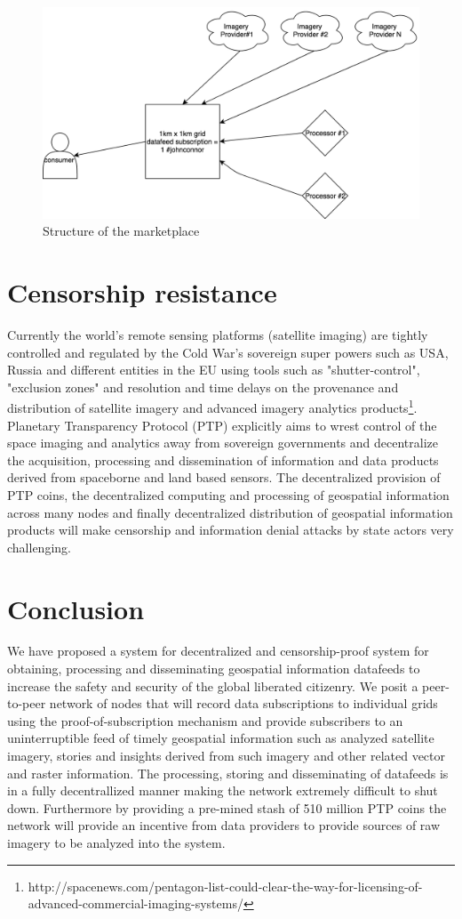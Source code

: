\documentclass[aps,prl,preprint,groupedaddress]{revtex4}
\begin{document}
\begin{figure}[h]
\includegraphics[width=0.5\linewidth]{CIC.png}%
\caption{Structure of the marketplace}
\end{figure}

\section{Censorship resistance}
Currently the world's remote sensing platforms (satellite imaging) are tightly controlled and regulated by the Cold War's sovereign super powers such as USA, Russia and different entities in the EU using tools such as "shutter-control", "exclusion zones" and resolution and time delays on the provenance and distribution of satellite imagery and advanced imagery analytics products\footnote{http://spacenews.com/pentagon-list-could-clear-the-way-for-licensing-of-advanced-commercial-imaging-systems/}.  Planetary Transparency Protocol (PTP) explicitly aims to wrest control of the space imaging and analytics away from sovereign governments and decentralize the acquisition, processing and dissemination of information and data products derived from spaceborne and land based sensors. The decentralized provision of PTP coins, the decentralized computing and processing of geospatial information across many nodes and finally decentralized distribution of geospatial information products will make censorship and information denial attacks by state actors very challenging\cite{livingston2015commercial}.  

\section{Conclusion}
We have proposed a system for decentralized and censorship-proof system for obtaining, processing and disseminating geospatial information datafeeds to increase the safety and security of the global liberated citizenry. We posit a peer-to-peer network of nodes that will record data subscriptions to individual grids using the proof-of-subscription mechanism and provide subscribers to an uninterruptible feed of timely geospatial information such as analyzed satellite imagery, stories and insights derived from such imagery and other related vector and raster information. The processing, storing and disseminating of datafeeds is in a fully decentrallized manner making the network extremely difficult to shut down. Furthermore by providing a pre-mined stash of 510 million PTP coins the network will provide an incentive from data providers to provide sources of raw imagery to be analyzed into the system.  
\end{document}
